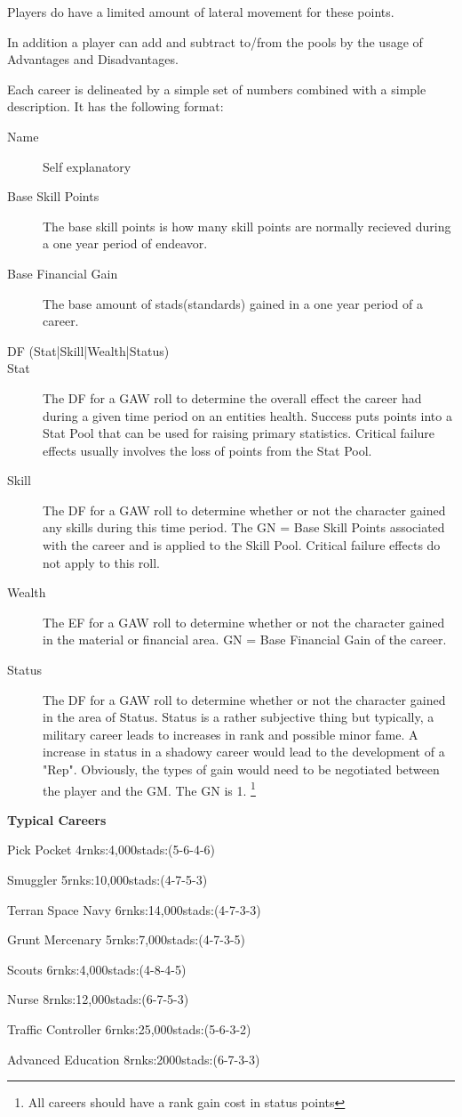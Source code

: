 Players do have a limited amount of lateral movement for these  points.

In addition a player can add and subtract to/from the pools by the 
usage of Advantages and Disadvantages.

Each career is delineated by a simple set of numbers combined with a
simple description. It has the following format:

\begin{description}
	\item [Name]
	Self explanatory
	\item[Base Skill Points]
	The base skill points is how many skill points are normally
	recieved during a one year period of endeavor.
	\item[Base Financial Gain]
	The base amount of stads(standards) gained in a one year period of a career.
	\item[DF (Stat|Skill|Wealth|Status)]
		\item[Stat]
		The DF for a GAW roll to determine the overall effect the career
		had during a given time period on an entities health. Success 
		puts points into a Stat Pool that can be used for raising primary
		statistics. Critical failure effects usually involves the loss of
		points from the Stat Pool.
		\item[Skill]
		The DF for a GAW roll to determine whether or not the character
		gained any skills during this time period. The GN = Base Skill 
		Points associated with the career and is applied to the Skill 
		Pool. Critical failure effects do not apply to this roll.
		\item[Wealth]
		The EF for a GAW roll to determine whether or not the character
		gained in the material or financial area. GN = Base Financial 
		Gain of the career. 
		\item[Status]
		The DF for a GAW roll to determine whether or not the character
		gained in the area of Status. Status is a rather subjective thing
		but typically, a military career leads to increases in rank and
		possible minor fame. A increase in status in a shadowy career would
		lead to the development of a "Rep". Obviously, the types of gain would
		need to be negotiated between the player and the GM. The GN is 1.
		\footnote{All careers should have a rank gain cost in status points}
\end{description}

{\bf Typical Careers}
	\begin{relate}
		\item[Pick Pocket]
		4rnks:4,000stads:(5-6-4-6) 
		\item[Smuggler]
		5rnks:10,000stads:(4-7-5-3)
		\item[Terran Space Navy]
		6rnks:14,000stads:(4-7-3-3)
		\item[Grunt Mercenary]
		5rnks:7,000stads:(4-7-3-5)
		\item[Scouts]
		6rnks:4,000stads:(4-8-4-5)
		\item[Nurse]
		8rnks:12,000stads:(6-7-5-3)
		\item[Traffic Controller]
		6rnks:25,000stads:(5-6-3-2)
		\item[Advanced Education]
		8rnks:2000stads:(6-7-3-3)
	\end{relate}

